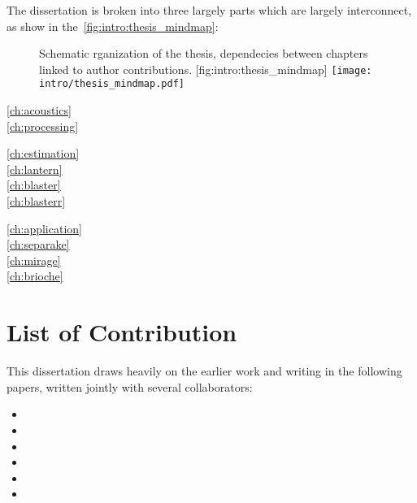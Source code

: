 The dissertation is broken into three largely parts which are largely interconnect, as show in the~\cref{fig:intro:thesis_mindmap}:

\begin{figure}[t]
    \begin{sidecaption}{%
        Schematic rganization of the thesis, dependecies between chapters linked to author contributions.
    }[fig:intro:thesis_mindmap]
    \centering
    \texttt{[image: intro/thesis\_mindmap.pdf]}
    \end{sidecaption}
\end{figure}


\begin{description}
    \item[\cref{ch:acoustics}]\synopsisChAcoustics
    \item[\cref{ch:processing}]\synopsisChProcessing
\end{description}

\begin{description}
    \item[\cref{ch:estimation}]\synopsisChEstimation
    \item[\cref{ch:lantern}]\blindtext[1]
    \item[\cref{ch:blaster}]\blindtext[1]
    \item[\cref{ch:blasterr}]\blindtext[1]
\end{description}


\begin{description}
\item[\cref{ch:application}]\blindtext[1]
\item[\cref{ch:separake}]\blindtext[1]
\item[\cref{ch:mirage}]\blindtext[1]
\item[\cref{ch:brioche}]\blindtext[1]
\end{description}

\section{List of Contribution}
This dissertation draws heavily on the earlier work and writing in the following papers, written jointly with several collaborators:

\begin{itemize}
    \item {}
    \item {}
    \item {}
    \item {}
    \item {}
    \item {}
\end{itemize}


